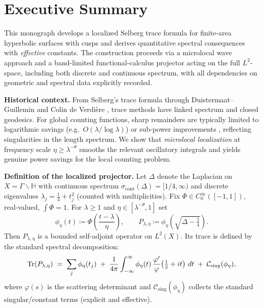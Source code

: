 
\section{Executive Summary}

This monograph develops a localized Selberg trace formula for finite-area
hyperbolic surfaces with cusps and derives quantitative spectral consequences
with \emph{effective} constants. The construction proceeds via a microlocal
wave approach and a band-limited functional-calculus projector acting on the
full $L^2$-space, including both discrete and continuous spectrum, with all
dependencies on geometric and spectral data explicitly recorded.

\medskip
\noindent\textbf{Historical context.}
From Selberg’s trace formula \cite{Selberg1956} through
Duistermaat–Guillemin \cite{DG1975} and Colin de Verdière \cite{CdV1980},
trace methods have linked spectrum and closed geodesics. For global counting
functions, sharp remainders are typically limited to logarithmic savings
(e.g.\ $O(\lambda/\log\lambda)$) or sub-power improvements \cite{Ivrii2016,Berger2019},
reflecting singularities in the length spectrum. We show that \emph{microlocal
localization} at frequency scale $\eta\ge \lambda^{-\theta}$ smooths the
relevant oscillatory integrals and yields genuine power savings for the local
counting problem.

\medskip
\noindent\textbf{Definition of the localized projector.}
Let $\Delta$ denote the Laplacian on $X=\Gamma\backslash\mathbb{H}$ with
continuous spectrum $\sigma_{\mathrm{cont}}(\Delta)=[1/4,\infty)$ and discrete
eigenvalues $\lambda_j=\tfrac14+t_j^2$ (counted with multiplicities). Fix
$\Phi\in C^\infty_0([-1,1])$, real-valued, $\int\Phi=1$. For $\lambda\ge1$ and
$\eta\in[\lambda^{-\theta},1]$ set
\[
  \phi_\eta(t)\coloneqq \Phi\!\left(\frac{t-\lambda}{\eta}\right),\qquad
  P_{\lambda,\eta}\coloneqq \phi_\eta\!\left(\sqrt{\Delta-\tfrac14}\right).
\]
Then $P_{\lambda,\eta}$ is a bounded self-adjoint operator on $L^2(X)$.
Its trace is defined by the standard spectral decomposition:
\begin{equation}\label{eq:trace-decomp}
  \operatorname{Tr}(P_{\lambda,\eta})
  \;=\; \sum_j \phi_\eta(t_j)
        \;+\; \frac{1}{4\pi}\int_{-\infty}^{\infty}
        \phi_\eta(t)\,\frac{\varphi'}{\varphi}\!\left(\tfrac12+it\right)\,dt
        \;+\; \mathcal{C}_{\mathrm{sing}}(\phi_\eta),
\end{equation}
where $\varphi(s)$ is the scattering determinant and
$\mathcal{C}_{\mathrm{sing}}(\phi_\eta)$ collects the standard singular/constant
terms (explicit and effective).

